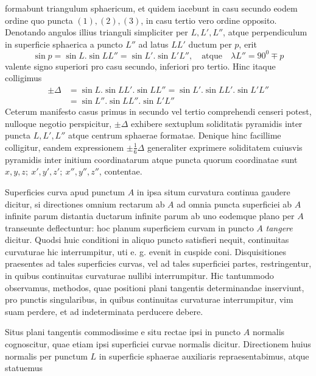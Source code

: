 formabunt triangulum sphaericum, et quidem iacebunt in casu secundo eodem ordine quo puncta \((1),(2),(3)\), in casu tertio vero ordine opposito. Denotando angulos illius trianguli simpliciter per \(L,L',L''\), atque perpendiculum in superficie sphaerica a puncto \(L''\) ad latus \(LL'\) ductum per \(p\), erit
\[
\sin p=\sin L\mathord{.}\sin LL''=\sin L'\mathord{.}\sin L'L'',\quad\text{atque}\quad\lambda L''=90^0\mp p
\]
\noindent valente signo superiori pro casu secundo, inferiori pro tertio. Hinc itaque colligimus
\[
\begin{aligned}
\pm\Delta&=\sin L\mathord{.}\sin LL'\mathord{.}\sin LL''=\sin L'\mathord{.}\sin LL'\mathord{.}\sin L'L''\\
&=\sin L''\mathord{.}\sin LL''\mathord{.}\sin L'L''
\end{aligned}
\]
\noindent Ceterum manifesto casus primus in secundo vel tertio comprehendi censeri potest, nulloque negotio perspicitur, \(\pm\Delta\) exhibere sextuplum soliditatis pyramidis inter puncta \(L,L',L''\) atque centrum sphaerae formatae. Denique hinc facillime colligitur, eandem expressionem \(\pm\tfrac{1}{6}\Delta\) generaliter exprimere soliditatem cuiusvis pyramidis inter initium coordinatarum atque puncta quorum coordinatae sunt \(x,y,z;\ x',y',z';\ x'',y'',z''\), contentae.

\indent Superficies curva apud punctum \(A\) in ipsa situm curvatura continua gaudere dicitur, si directiones omnium rectarum ab \(A\) ad omnia puncta superficiei ab \(A\) infinite parum distantia ductarum infinite parum ab uno eodemque plano per \(A\) transeunte deflectuntur: hoc planum superficiem curvam in puncto \(A\) \textit{tangere} dicitur. Quodsi huic conditioni in aliquo puncto satisfieri nequit, continuitas curvaturae hic interrumpitur, uti e. g. evenit in cuspide coni. Disquisitiones praesentes ad tales superficies curvas, vel ad tales superficiei partes, restringentur, in quibus continuitas curvaturae nullibi interrumpitur. Hic tantummodo observamus, methodos, quae positioni plani tangentis determinandae inserviunt, pro punctis singularibus, in quibus continuitas curvaturae interrumpitur, vim suam perdere, et ad indeterminata perducere debere.

\indent Situs plani tangentis commodissime e situ rectae ipsi in puncto \(A\) normalis cognoscitur, quae etiam ipsi superficiei curvae normalis dicitur. Directionem huius normalis per punctum \(L\) in superficie sphaerae auxiliaris repraesentabimus, atque statuemus
